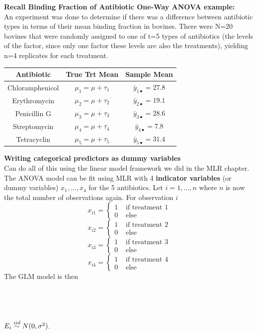 \newpage

\textbf{Recall Binding Fraction of Antibiotic One-Way ANOVA example:}\\
An experiment was done to determine if there was a difference between antibiotic types in terms of their mean binding fraction in bovines.  There were N=20 bovines that were randomly assigned to one of t=5 types of antibiotics (the levels of the factor, since only one factor these levels are also the treatments), yielding n=4 replicates for each treatment.  
\begin{center}
\begin{tabular}{c|cc} 
Antibiotic& True Trt Mean & Sample Mean\\\hline
Chloramphenicol&$\mu_1=\mu+\tau_1$&$\bar{y}_{1\bullet}=27.8$\\
Erythromycin&$\mu_2=\mu+\tau_2$&$\bar{y}_{2\bullet}=19.1$\\
Penicillin G &$\mu_3=\mu+\tau_3$&$\bar{y}_{3\bullet}=28.6$\\
Streptomycin&$\mu_4=\mu+\tau_4$&$\bar{y}_{4\bullet}=7.8$\\
Tetracyclin&$\mu_5=\mu+\tau_5$&$\bar{y}_{5\bullet}=31.4$\\
\end{tabular}
\end{center}

\Large\textbf{Writing categorical predictors as dummy variables}\large\\
Can do all of this using the linear model framework we did in the MLR chapter.\\

The ANOVA model can be fit using MLR with 4 {\bf indicator variables} (or dummy variables) $x_1,\ldots,x_4$ for the 5 antibiotics.  Let $i=1,...,n$ where $n$ is now the total number of observations again.  For observation $i$
\[ 
x_{i1} = 
\begin{cases} 1 & \text{ if treatment }1 \\
0 & \text{ else } 
\end{cases}
\]
\[ 
x_{i2} = 
\begin{cases} 1 & \text{ if treatment }2 \\
0 & \text{ else } 
\end{cases}
\]
\[ 
x_{i3} = 
\begin{cases} 1 & \text{ if treatment }3 \\
0 & \text{ else } 
\end{cases}
\]
\[ 
x_{i4} = 
\begin{cases} 1 & \text{ if treatment }4 \\
0 & \text{ else } 
\end{cases}
\]
The GLM model is then \\~\\~\\~\\~\\
$E_{i} \stackrel{iid}{\sim} N(0,\sigma^2)$.\\~\\

